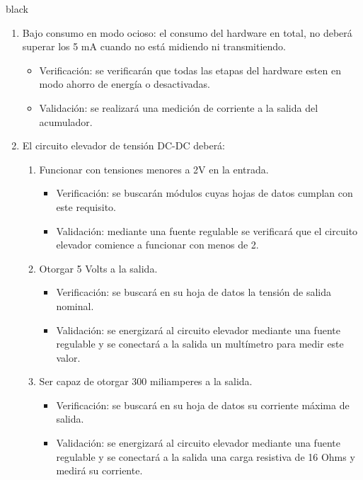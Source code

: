 \documentclass[11pt]{charter}
\begin{document}
\begin{consigna}{black}
\begin{enumerate}
\begin{enumerate}[label*=\arabic*.]
			\item Bajo consumo en modo ocioso: el consumo del hardware en total, no deberá superar los 5 mA cuando no está midiendo ni transmitiendo.
				\begin{itemize}
					\item Verificación: se verificarán que todas las etapas del hardware esten en modo ahorro de energía o desactivadas.\\
					\item Validación: se realizará una medición de corriente a la salida del acumulador.\\
				\end{itemize}
				
			\item El circuito elevador de tensión DC-DC deberá:
			\begin{enumerate}[label*=\arabic*.]
				\item Funcionar con tensiones menores a 2V en la entrada.
					\begin{itemize}
						\item Verificación: se buscarán módulos cuyas hojas de datos cumplan con este requisito.\\
						\item Validación: mediante una fuente regulable se verificará que el circuito elevador comience a funcionar con menos de 2.\\
					\end{itemize}
					
				\item Otorgar 5 Volts a la salida.
					\begin{itemize}
						\item Verificación: se buscará en su hoja de datos la tensión de salida nominal.\\
						\item Validación: se energizará al circuito elevador mediante una fuente regulable y se conectará a la salida un multímetro para medir este valor.\\
					\end{itemize}
					
				\item Ser capaz de otorgar 300 miliamperes a la salida.
					\begin{itemize}
						\item Verificación: se buscará en su hoja de datos su corriente máxima de salida.\\
						\item Validación: se energizará al circuito elevador mediante una fuente regulable y se conectará a la salida una carga resistiva de 16 Ohms y medirá su corriente.\\
					\end{itemize}
			\end{enumerate}
			

\end{enumerate}
\end{enumerate}
\end{consigna}
\end{document}
